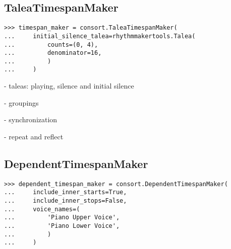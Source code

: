 \subsection{TaleaTimespanMaker} %

\begin{comment}
<abjad>
timespan_maker = consort.TaleaTimespanMaker(
    initial_silence_talea=rhythmmakertools.Talea(
        counts=(0, 4),
        denominator=16,
        )
    )
</abjad>
\end{comment}

\begin{singlespacing}
\vspace{-0.5\baselineskip}
\begin{lstlisting}
>>> timespan_maker = consort.TaleaTimespanMaker(
...     initial_silence_talea=rhythmmakertools.Talea(
...         counts=(0, 4),
...         denominator=16,
...         )
...     )
\end{lstlisting}
\end{singlespacing}

- taleas: playing, silence and initial silence

- groupings

- synchronization

- repeat and reflect

\subsection{DependentTimespanMaker} %

\begin{comment}
<abjad>
dependent_timespan_maker = consort.DependentTimespanMaker(
    include_inner_starts=True,
    include_inner_stops=False,
    voice_names=(
        'Piano Upper Voice',
        'Piano Lower Voice',
        )
    )
</abjad>
\end{comment}

\begin{singlespacing}
\vspace{-0.5\baselineskip}
\begin{lstlisting}
>>> dependent_timespan_maker = consort.DependentTimespanMaker(
...     include_inner_starts=True,
...     include_inner_stops=False,
...     voice_names=(
...         'Piano Upper Voice',
...         'Piano Lower Voice',
...         )
...     )
\end{lstlisting}
\end{singlespacing}

